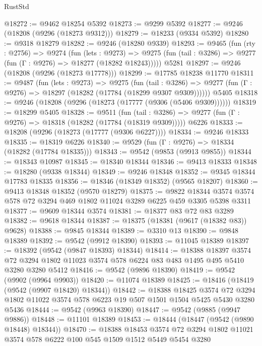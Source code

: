 \begin{lexlean}{RustStd}
\begin{coremodule}
@18272 := @9462 @18254 @5392
@18273 := @9299 @5392
@18277 := @9246 (@18208 (@9296 (@18273 @9312)))
@18279 := @18233 (@9334 @5392)
@18280 := @9318 @18279
@18282 := @9246 (@18280 @9339)
@18293 := @9465
    (fun (rty : @2756) =>
    @9274
      (fun (lets : @9273) =>
      @9275 (fun (tail : @3286) => @9277 (fun (Γ : @9276) => @18277 (@18282 @18243)))))
    @5281
@18297 := @9246 (@18208 (@9296 (@18273 @17778)))
@18299 := @17785 @18238 @11770
@18311 := @9487
    (fun (lets : @9273) =>
    @9275
      (fun (tail : @3286) =>
      @9277 (fun (Γ : @9276) => @18297 (@18282 (@17784 (@18299 @9307 @9309))))))
    @5405
@18318 := @9246 (@18208 (@9296 (@18273 (@17777 (@9306 (@5406 @9309))))))
@18319 := @18299 @5405
@18328 := @9511
    (fun (tail : @3286) => @9277 (fun (Γ : @9276) => @18318 (@18282 (@17784 (@18319 @9309)))))
    @6226
@18333 := @18208 (@9296 (@18273 (@17777 (@9306 @6227))))
@18334 := @9246 @18333
@18335 := @18319 @6226
@18340 := @9529 (fun (Γ : @9276) => @18334 (@18282 (@17784 @18335)))
@18343 := @9542 (@9853 (@9913 @9855))
@18344 := @18343 @10987
@18345 := @18340 @18344
@18346 := @9413 @18333
@18348 := @18280 (@9338 @18344)
@18349 := @9246 @18348
@18352 := @9345 @18344 @17783 @18335
@18356 := @18346 (@18349 @18352) (@9565 @18207)
@18360 := @9413 @18348 @18352 (@9570 @18279)
@18375 := @9822
    @18344
    @3574
    @3574
    @578
    @72
    @3294
    @469
    @1802
    @11024
    @3289
    @6225
    @459
    @3305
    @5398
    @3311
@18377 := @9609 @18344 @3574
@18381 := @18377 @83 @72 @83 @3289
@18382 := @9618 @18344
@18387 := @18375 (@18381 (@9617 (@18382 @83)) @9628)
@18388 := @9845 @18344
@18389 := @3310 @13
@18390 := @9848 @18389
@18392 := @9542 (@9912 @18390)
@18393 := @11045 @18389
@18397 := @18392 (@9542 (@9847 @18393) @18344)
@18414 := @18388
    @18397
    @3574
    @72
    @3294
    @1802
    @11023
    @3574
    @578
    @6224
    @83
    @483
    @1495
    @495
    @5410
    @3280
    @3280
    @5412
@18416 := @9542 (@9896 @18390)
@18419 := @9542 (@9902 (@9964 @9903))
@18420 := @11074 @18389
@18425 := @18416 (@18419 (@9542 (@9907 @18420) @18344))
@18442 := @18388
    @18425
    @3574
    @72
    @3294
    @1802
    @11022
    @3574
    @578
    @6223
    @19
    @507
    @1501
    @1504
    @5425
    @5430
    @3280
    @5436
@18444 := @9542 (@9963 @18390)
@18447 := @9542 (@9885 (@9947 @9886))
@18448 := @11101 @18389
@18453 := @18444 (@18447 (@9542 (@9890 @18448) @18344))
@18470 := @18388
    @18453
    @3574
    @72
    @3294
    @1802
    @11021
    @3574
    @578
    @6222
    @100
    @545
    @1509
    @1512
    @5449
    @5454
    @3280

\end{coremodule}
\end{lexlean}
